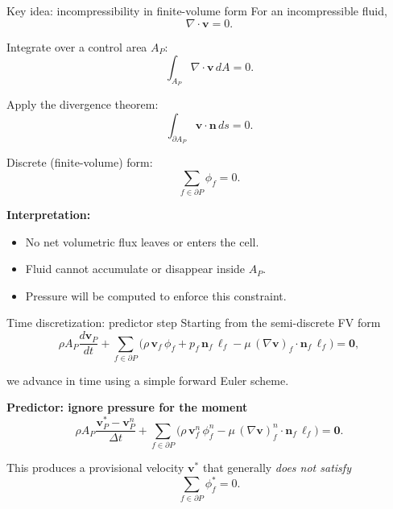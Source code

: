 \documentclass[aspectratio=169]{beamer}
\begin{document}
\begin{frame}{Key idea: incompressibility in finite-volume form}
For an incompressible fluid,
\[
\nabla \cdot \mathbf{v} = 0.
\]

\bigskip
Integrate over a control area $A_P$:
\[
\int_{A_P} \nabla \cdot \mathbf{v}\, dA = 0.
\]

\bigskip
Apply the divergence theorem:
\[
\int_{\partial A_P} \mathbf{v}\cdot \mathbf{n}\, ds = 0.
\]

\bigskip
Discrete (finite-volume) form:
\[
\boxed{
\sum_{f\in\partial P} \phi_f = 0.
}
\]

\end{frame}

\begin{frame}
\bigskip
\textbf{Interpretation:}

\begin{itemize}
\item No net volumetric flux leaves or enters the cell.
\item Fluid cannot accumulate or disappear inside $A_P$.
\item Pressure will be computed to enforce this constraint.
\end{itemize}
\end{frame}

\begin{frame}{Time discretization: predictor step}
Starting from the semi-discrete FV form
\[
\rho A_P \frac{d\mathbf{v}_P}{dt}
+
\sum_{f\in\partial P}
\Big(
\rho\,\mathbf{v}_f\,\phi_f
+
p_f\,\mathbf{n}_f\,\ell_f
-
\mu\,(\nabla\mathbf{v})_f\cdot\mathbf{n}_f\,\ell_f
\Big)
=
\mathbf{0},
\]

\bigskip
we advance in time using a simple forward Euler scheme.

\bigskip
\textbf{Predictor: ignore pressure for the moment}
\[
\rho A_P
\frac{\mathbf{v}_P^{*}-\mathbf{v}_P^{n}}{\Delta t}
+
\sum_{f\in\partial P}
\Big(
\rho\,\mathbf{v}_f^{n}\,\phi_f^{n}
-
\mu\,(\nabla\mathbf{v})_f^{n}\cdot\mathbf{n}_f\,\ell_f
\Big)
=
\mathbf{0}.
\]

\bigskip
This produces a provisional velocity $\mathbf{v}^{*}$ that generally
\emph{does not satisfy}
\[
\sum_{f\in\partial P} \phi_f^{*} = 0.
\]
\end{frame}
\end{document}
